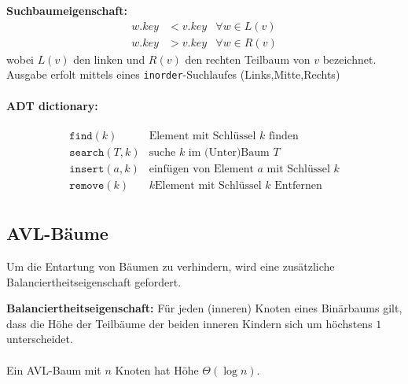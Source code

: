 \documentclass{scrartcl}
\begin{document}
\begin{shaded}
\textbf{Suchbaumeigenschaft:}
\begin{align*}
	w.key &< v.key & \forall w \in L(v) \\
	w.key &> v.key & \forall w \in R(v)
\end{align*}
wobei $L(v)$ den linken und $R(v)$ den rechten Teilbaum von $v$ bezeichnet. \\
Ausgabe erfolt mittels eines \texttt{inorder}-Suchlaufes (Links,Mitte,Rechts)
\paragraph{ADT dictionary:}
\begin{align*}
\texttt{find}(k) & \textrm{Element mit Schlüssel } k \textrm{ finden} \\
\texttt{search}(T,k) & \textrm{suche } k \textrm{ im (Unter)Baum } T \\
\texttt{insert}(a,k) & \textrm{einfügen von Element } a \textrm{ mit Schlüssel } k \\
\texttt{remove}(k) & k \textrm{Element mit Schlüssel } k \textrm{ Entfernen} \\
\end{align*}
\end{shaded}

\subsection{AVL-Bäume}
Um die Entartung von Bäumen zu verhindern, wird eine zusätzliche Balanciertheitseigenschaft gefordert.

\begin{shaded}
\textbf{Balanciertheitseigenschaft:} Für jeden (inneren) Knoten eines Binärbaums gilt, dass die Höhe der Teilbäume der beiden inneren Kindern sich um höchstens $1$ unterscheidet.\\ \ \\ 
Ein AVL-Baum mit $n$ Knoten hat Höhe $\Theta(\log n)$.
\end{shaded}
\end{document}
